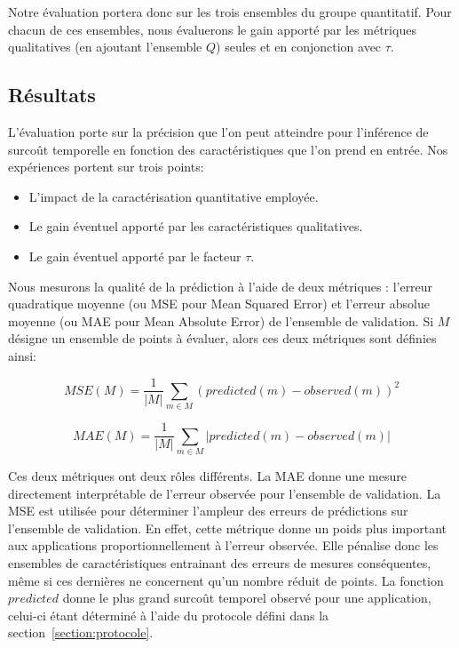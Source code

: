 Notre évaluation portera donc sur les trois ensembles du groupe quantitatif.
Pour chacun de ces ensembles, nous évaluerons le gain apporté par les métriques qualitatives (en ajoutant l'ensemble $Q$) seules et en conjonction avec $\tau$.

\subsection{Résultats}

L'évaluation porte sur la précision que l'on peut atteindre pour l'inférence de surcoût temporelle en fonction des caractéristiques que l'on prend en entrée.
Nos expériences portent sur trois points:
\begin{itemize}
	\item L'impact de la caractérisation quantitative employée.
	\item Le gain éventuel apporté par les caractéristiques qualitatives.
	\item Le gain éventuel apporté par le facteur $\tau$.
\end{itemize}

Nous mesurons la qualité de la prédiction  à l'aide de deux métriques : l'erreur quadratique moyenne (ou MSE pour Mean Squared Error) et l'erreur absolue moyenne (ou MAE pour Mean Absolute Error) de l'ensemble de validation.
Si $M$ désigne un ensemble de points à évaluer, alors ces deux métriques sont définies ainsi:

\begin{equation}
	\label{equation:mse}
	MSE(M) = \frac{1}{|M|} \sum_{m\in M} (predicted(m) - observed(m))^2
\end{equation}

\begin{equation}
	\label{equation:mae}
	MAE(M) = \frac{1}{|M|} \sum_{m\in M} |predicted(m) - observed(m)|
\end{equation}

Ces deux métriques ont deux rôles différents.
La MAE donne une mesure directement interprétable de l'erreur observée pour l'ensemble de validation.
La MSE est utilisée pour déterminer l'ampleur des erreurs de prédictions sur l'ensemble de validation.
En effet, cette métrique donne un poids plus important aux applications proportionnellement à l'erreur observée.
Elle pénalise donc les ensembles de caractéristiques entrainant des erreurs de mesures conséquentes, même si ces dernières ne concernent qu'un nombre réduit de points.
La fonction $predicted$ donne le plus grand surcoût temporel observé pour une application, celui-ci étant déterminé à l'aide du protocole défini dans la section~\ref{section:protocole}.

